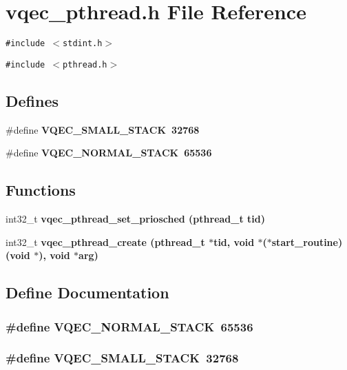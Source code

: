 \section{vqec\_\-pthread.h File Reference}
\label{vqec__pthread_8h}
{\tt \#include $<$stdint.h$>$}\par
{\tt \#include $<$pthread.h$>$}\par
\subsection*{Defines}
\begin{CompactItemize}
\item 
\#define \bf{VQEC\_\-SMALL\_\-STACK}~32768
\item 
\#define \bf{VQEC\_\-NORMAL\_\-STACK}~65536
\end{CompactItemize}
\subsection*{Functions}
\begin{CompactItemize}
\item 
int32\_\-t \bf{vqec\_\-pthread\_\-set\_\-priosched} (pthread\_\-t tid)
\item 
int32\_\-t \bf{vqec\_\-pthread\_\-create} (pthread\_\-t $\ast$tid, void $\ast$($\ast$start\_\-routine)(void $\ast$), void $\ast$arg)
\end{CompactItemize}


\subsection{Define Documentation}
\subsubsection{\setlength{\rightskip}{0pt plus 5cm}\#define VQEC\_\-NORMAL\_\-STACK~65536}\label{vqec__pthread_8h_a48ee1e82d8002499cc60bf943f40571}


\subsubsection{\setlength{\rightskip}{0pt plus 5cm}\#define VQEC\_\-SMALL\_\-STACK~32768}\label{vqec__pthread_8h_065e7476d58765750f568383b4cd009f}




